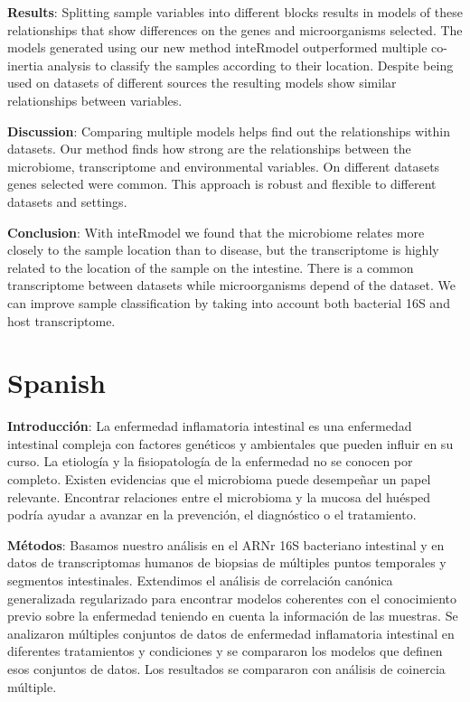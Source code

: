 \documentclass[
  12pt,
  a4paper,
  twoside,
  openright]{book}
\begin{document}
\textbf{Results}: Splitting sample variables into different blocks results in models of these relationships that show differences on the genes and microorganisms selected.
The models generated using our new method inteRmodel outperformed multiple co-inertia analysis to classify the samples according to their location.
Despite being used on datasets of different sources the resulting models show similar relationships between variables.

\textbf{Discussion}:
Comparing multiple models helps find out the relationships within datasets.
Our method finds how strong are the relationships between the microbiome, transcriptome and environmental variables.
On different datasets genes selected were common.
This approach is robust and flexible to different datasets and settings.

\textbf{Conclusion}: With inteRmodel we found that the microbiome relates more closely to the sample location than to disease, but the transcriptome is highly related to the location of the sample on the intestine.
There is a common transcriptome between datasets while microorganisms depend of the dataset.
We can improve sample classification by taking into account both bacterial 16S and host transcriptome.

\hypertarget{spanish}{%
\section*{Spanish}\label{spanish}}

\textbf{Introducción}: La enfermedad inflamatoria intestinal es una enfermedad intestinal compleja con factores genéticos y ambientales que pueden influir en su curso.
La etiología y la fisiopatología de la enfermedad no se conocen por completo.
Existen evidencias que el microbioma puede desempeñar un papel relevante.
Encontrar relaciones entre el microbioma y la mucosa del huésped podría ayudar a avanzar en la prevención, el diagnóstico o el tratamiento.

\textbf{Métodos}: Basamos nuestro análisis en el ARNr 16S bacteriano intestinal y en datos de transcriptomas humanos de biopsias de múltiples puntos temporales y segmentos intestinales.
Extendimos el análisis de correlación canónica generalizada regularizado para encontrar modelos coherentes con el conocimiento previo sobre la enfermedad teniendo en cuenta la información de las muestras.
Se analizaron múltiples conjuntos de datos de enfermedad inflamatoria intestinal en diferentes tratamientos y condiciones y se compararon los modelos que definen esos conjuntos de datos.
Los resultados se compararon con análisis de coinercia múltiple.
\end{document}
